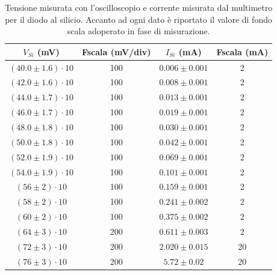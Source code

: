 \documentclass[a4paper,11pt]{article}
\begin{document}
\begin{table}[h!]
  \begin{center}
    \begin{tabular}{c|c|c|c}
      \textbf{$V_{Si}$ (mV)}    & \textbf{Fscala (mV/div)} & \textbf{$I_{Si}$ (mA)} & \textbf{Fscala (mA)} \\
      \hline
      $(40.0 \pm 1.6) \cdot 10$ & 100                      & $0.006 \pm 0.001$      & 2                    \\
      $(42.0 \pm 1.6) \cdot 10$ & 100                      & $0.008 \pm 0.001$      & 2                    \\
      $(44.0 \pm 1.7) \cdot 10$ & 100                      & $0.013 \pm 0.001$      & 2                    \\
      $(46.0 \pm 1.7) \cdot 10$ & 100                      & $0.019 \pm 0.001$      & 2                    \\
      $(48.0 \pm 1.8) \cdot 10$ & 100                      & $0.030 \pm 0.001$      & 2                    \\
      $(50.0 \pm 1.8) \cdot 10$ & 100                      & $0.042 \pm 0.001$      & 2                    \\
      $(52.0 \pm 1.9) \cdot 10$ & 100                      & $0.069 \pm 0.001$      & 2                    \\
      $(54.0 \pm 1.9) \cdot 10$ & 100                      & $0.101 \pm 0.001$      & 2                    \\
      $(56 \pm 2) \cdot 10$     & 100                      & $0.159 \pm 0.001$      & 2                    \\
      $(58 \pm 2) \cdot 10$     & 100                      & $0.241\pm 0.002$       & 2                    \\
      $(60 \pm 2) \cdot 10$     & 100                      & $0.375\pm 0.002$       & 2                    \\
      $(64 \pm 3) \cdot 10$     & 200                      & $0.611 \pm 0.003$      & 2                    \\
      $(72 \pm 3) \cdot 10$     & 200                      & $2.020 \pm 0.015$      & 20                   \\
      $(76 \pm 3) \cdot 10$     & 200                      & $5.72 \pm 0.02$        & 20                   \\
    \end{tabular}
    \caption{Tensione misurata con l'oscilloscopio e corrente misurata dal multimetro per il diodo al silicio. Accanto ad ogni dato è riportato il valore di fondo scala adoperato in fase di misurazione.}
  \end{center}
\end{table}
\end{document}

